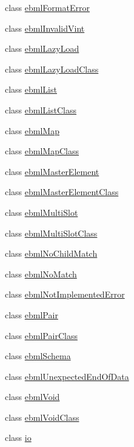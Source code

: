 \begin{DoxyCompactItemize}
class \mbox{\hyperlink{classebml_1_1ebmlFormatError}{ebml\+Format\+Error}}
\item 
class \mbox{\hyperlink{classebml_1_1ebmlInvalidVint}{ebml\+Invalid\+Vint}}
\item 
class \mbox{\hyperlink{classebml_1_1ebmlLazyLoad}{ebml\+Lazy\+Load}}
\item 
class \mbox{\hyperlink{classebml_1_1ebmlLazyLoadClass}{ebml\+Lazy\+Load\+Class}}
\item 
class \mbox{\hyperlink{classebml_1_1ebmlList}{ebml\+List}}
\item 
class \mbox{\hyperlink{classebml_1_1ebmlListClass}{ebml\+List\+Class}}
\item 
class \mbox{\hyperlink{classebml_1_1ebmlMap}{ebml\+Map}}
\item 
class \mbox{\hyperlink{classebml_1_1ebmlMapClass}{ebml\+Map\+Class}}
\item 
class \mbox{\hyperlink{classebml_1_1ebmlMasterElement}{ebml\+Master\+Element}}
\item 
class \mbox{\hyperlink{classebml_1_1ebmlMasterElementClass}{ebml\+Master\+Element\+Class}}
\item 
class \mbox{\hyperlink{classebml_1_1ebmlMultiSlot}{ebml\+Multi\+Slot}}
\item 
class \mbox{\hyperlink{classebml_1_1ebmlMultiSlotClass}{ebml\+Multi\+Slot\+Class}}
\item 
class \mbox{\hyperlink{classebml_1_1ebmlNoChildMatch}{ebml\+No\+Child\+Match}}
\item 
class \mbox{\hyperlink{classebml_1_1ebmlNoMatch}{ebml\+No\+Match}}
\item 
class \mbox{\hyperlink{classebml_1_1ebmlNotImplementedError}{ebml\+Not\+Implemented\+Error}}
\item 
class \mbox{\hyperlink{classebml_1_1ebmlPair}{ebml\+Pair}}
\item 
class \mbox{\hyperlink{classebml_1_1ebmlPairClass}{ebml\+Pair\+Class}}
\item 
class \mbox{\hyperlink{classebml_1_1ebmlSchema}{ebml\+Schema}}
\item 
class \mbox{\hyperlink{classebml_1_1ebmlUnexpectedEndOfData}{ebml\+Unexpected\+End\+Of\+Data}}
\item 
class \mbox{\hyperlink{classebml_1_1ebmlVoid}{ebml\+Void}}
\item 
class \mbox{\hyperlink{classebml_1_1ebmlVoidClass}{ebml\+Void\+Class}}
\item 
class \mbox{\hyperlink{classebml_1_1io}{io}}
\item 

\end{DoxyCompactItemize}
